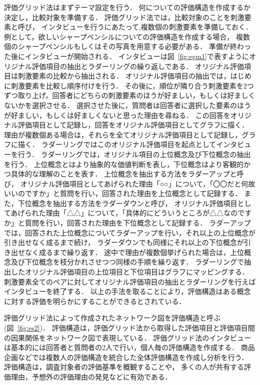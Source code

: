 \documentclass[syuuron]{kuee}
\begin{document}
		評価グリッド法はまずテーマ設定を行う．
		何についての評価構造を作成するか決定し，比較対象を準備する．
		評価グリッド法では，比較対象のことを刺激要素と呼び，
		インタビューを行うにあたって,複数個の刺激要素を準備しておく．
		例として，欲しいシャープペンシルについての評価構造を作成する場合，
		複数個のシャープペンシルもしくはその写真を用意する必要がある．
		準備が終わった後にインタビューが開始される．
		インタビューは図~\ref{fig:egm1}で表すようにオリジナル評価項目の抽出とラダーリングの繰り返しである．
		オリジナル評価項目は刺激要素の比較から抽出される．
		オリジナル評価項目の抽出では，はじめに刺激要素を比較し順序付けを行う．
		その後に，順位が隣り合う刺激要素を2つずつ取り上げ，回答者にどちらの刺激要素のほうが好ましい，もしくは好ましくないかを選択させる．
		選択させた後に，質問者は回答者に選択した要素のほうが好ましい，もしくは好ましくないと思った理由を尋ねる．
		この回答をオリジナル評価項目として記録し，回答をオリジナル評価項目としてグラフに描く．
		理由が複数個ある場合は，それらを全てオリジナル評価項目として記録し，グラフに描く．
		ラダーリングではこのオリジナル評価項目を起点としてインタビューを行う．
		ラダーリングでは，オリジナル項目の上位概念及び下位概念の抽出を行う．
		上位概念とはより抽象的な価値判断を表し，下位概念はより客観的かつ具体的な理解のことを表す．
		上位概念を抽出する方法をラダーアップと呼び，
		オリジナル評価項目としてあげられた理由「○○」について，「〇〇だと何故いいのですか」と質問を行い，回答された理由を上位概念として記録する．
		また，下位概念を抽出する方法をラダーダウンと呼び，
		オリジナル評価項目としてあげられた理由「△△」について，「具体的にどういうところが△△なのですか」と質問を行い，回答された理由を下位概念として記録する．
		ラダーアップでは，回答された上位概念についてラダーアップを行い，それ以上の上位概念が引き出せなく成るまで続け，
		ラダーダウンでも同様にそれ以上の下位概念が引き出せなく成るまで繰り返す．
		途中で理由が複数個挙げられた場合は，上位概念及び下位概念を枝分かれさせつつ同様の手順を繰り返す．
		ラダーリングで抽出したオリジナル評価項目の上位項目と下位項目はグラフにマッピングする．
		刺激要素全てのペアに対してオリジナル評価項目の抽出とラダーリングを行えばインタビューを終了する．
		以上の手法を取ることにより，評価構造はある概念に対する評価を明らかにすることができるとされている．
		
		評価グリッド法によって作成されたネットワーク図を評価構造と呼ぶ(図~\ref{fig:es2})．
		評価構造は，評価グリッド法から取得した評価項目と評価項目間の因果関係をネットワーク図で表現している．
		評価グリッド法のインタビューは基本的には回答者と質問者の2人で行い，個人毎の評価構造を作成する．
		商品企画などでは複数人の評価構造を統合した全体評価構造を作成し分析を行う．
		評価構造は，調査対象者の評価基準を概観することや，
		多くの人が共有する評価理由，予想外の評価理由の発見などに有効である．
		
\end{document}
